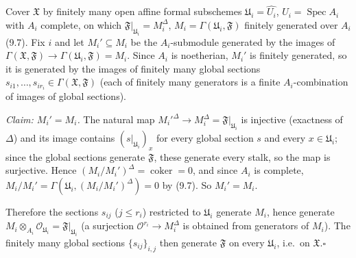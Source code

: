 \documentclass[11pt]{article}
\begin{document}
\pf
Cover $\mathfrak X$ by finitely many open affine formal subschemes $\mathfrak U_i=\widehat{U_i}$, $U_i=\operatorname{Spec}A_i$ with $A_i$ complete, on which $\mathfrak F|_{\mathfrak U_i}=M_i^\Delta$, $M_i=\Gamma(\mathfrak U_i,\mathfrak F)$ finitely generated over $A_i$ (9.7). Fix $i$ and let $M_i'\subseteq M_i$ be the $A_i$-submodule generated by the images of $\Gamma(\mathfrak X,\mathfrak F)\to\Gamma(\mathfrak U_i,\mathfrak F)=M_i$. Since $A_i$ is noetherian, $M_i'$ is finitely generated, so it is generated by the images of finitely many global sections $s_{i1},\dots,s_{ir_i}\in\Gamma(\mathfrak X,\mathfrak F)$ (each of finitely many generators is a finite $A_i$-combination of images of global sections).

\emph{Claim: $M_i'=M_i$.} The natural map $M_i'^\Delta\to M_i^\Delta=\mathfrak F|_{\mathfrak U_i}$ is injective (exactness of $\Delta$) and its image contains $(s|_{\mathfrak U_i})_x$ for every global section $s$ and every $x\in\mathfrak U_i$; since the global sections generate $\mathfrak F$, these generate every stalk, so the map is surjective. Hence $(M_i/M_i')^\Delta=\operatorname{coker}=0$, and since $A_i$ is complete, $M_i/M_i'=\Gamma(\mathfrak U_i,(M_i/M_i')^\Delta)=0$ by (9.7). So $M_i'=M_i$.

Therefore the sections $s_{ij}$ ($j\le r_i$) restricted to $\mathfrak U_i$ generate $M_i$, hence generate $M_i\otimes_{A_i}\mathcal O_{\mathfrak U_i}=\mathfrak F|_{\mathfrak U_i}$ (a surjection $\mathcal O^{r_i}\to M_i^\Delta$ is obtained from generators of $M_i$). The finitely many global sections $\{s_{ij}\}_{i,j}$ then generate $\mathfrak F$ on every $\mathfrak U_i$, i.e.\ on $\mathfrak X$.\hfill$\square$
\end{document}
